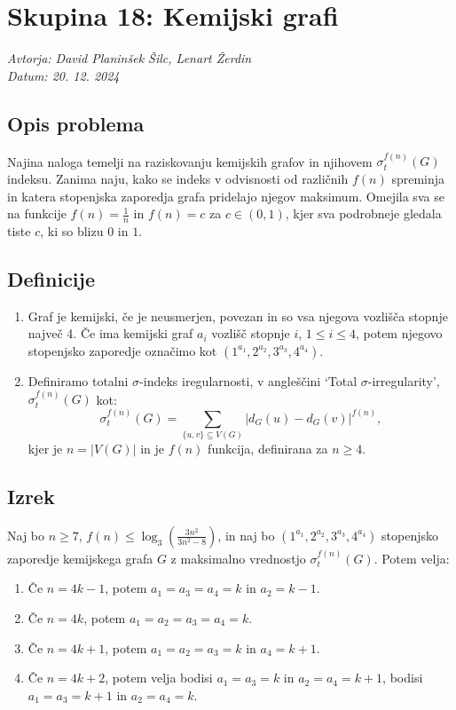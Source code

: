 \documentclass{article}
\begin{document}
\section*{Skupina 18: Kemijski grafi}
\textit{Avtorja: David Planinšek Šilc, Lenart Žerdin \\ Datum: 20. 12. 2024 \\}

\subsection*{Opis problema}
Najina naloga temelji na raziskovanju kemijskih grafov in njihovem
$\sigma_t^{f(n)}(G)$ indeksu. Zanima naju, kako se indeks v odvisnosti od
različnih $f(n)$ spreminja in katera stopenjska zaporedja grafa pridelajo njegov 
maksimum. Omejila sva se na funkcije $f(n) = \frac{1}{n}$ in $f(n) = c$ za 
$c \in (0, 1)$, kjer sva podrobneje gledala tiste $c$, ki so blizu $0$ in $1$.

\subsection*{Definicije}

\begin{enumerate}
    \item Graf je kemijski, če je neusmerjen, povezan in so vsa njegova vozlišča stopnje največ 4.
        Če ima kemijski graf $a_i$ vozlišč stopnje $i$, $1 \leq i \leq 4$,
        potem njegovo stopenjsko zaporedje označimo kot $(1^{a_1}, 2^{a_2}, 3^{a_3}, 4^{a_4})$. 

    \item Definiramo totalni $\sigma$-indeks iregularnosti, v angleščini
        `Total $\sigma$-irregularity', $\sigma_t^{f(n)}(G)$ kot:
        \[
        \sigma_t^{f(n)}(G) = \sum_{\{u,v\} \subseteq V(G)} \left| d_G(u) - d_G(v) \right|^{f(n)},
        \]
        kjer je $n = |V(G)|$ in je $f(n)$ funkcija, definirana za $n \geq 4$. 
\end{enumerate}

\subsection*{Izrek}
Naj bo $n \geq 7$, $f(n) \leq \log_3 \left( \frac{3n^2}{3n^2 - 8} \right)$, in naj bo $(1^{a_1}, 2^{a_2}, 3^{a_3}, 4^{a_4})$ stopenjsko zaporedje kemijskega grafa $G$ z maksimalno vrednostjo $\sigma_t^{f(n)}(G)$. Potem velja:
\begin{enumerate}
    \item Če $n = 4k - 1$, potem $a_1 = a_3 = a_4 = k$ in $a_2 = k - 1$.
    \item Če $n = 4k$, potem $a_1 = a_2 = a_3 = a_4 = k$.
    \item Če $n = 4k + 1$, potem $a_1 = a_2 = a_3 = k$ in $a_4 = k + 1$.
    \item Če $n = 4k + 2$, potem velja bodisi $a_1 = a_3 = k$ in $a_2 = a_4 = k + 1$, bodisi $a_1 = a_3 = k + 1$ in $a_2 = a_4 = k$. 
\end{enumerate}
\end{document}
